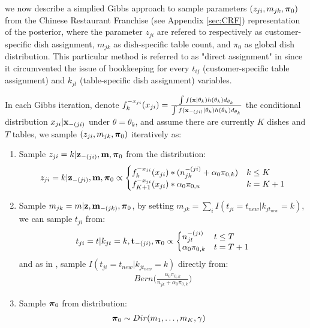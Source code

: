 \documentclass{article} %
\begin{document}
we now describe a simplied Gibbs approach to sample parameters $(z_{ji}, m_{jk}, \boldsymbol{\pi}_0)$ from the Chinese Restaurant Franchise (see Appendix \ref{sec:CRF}) representation of the posterior, where the parameter $z_{ji}$ are refered to respectively as customer-specific dish assignment, $m_{jk}$ as  dish-specific table count, and $\pi_0$ as global dish distribution. This particular method is  referred to as "direct assignment" in \cite{teh_hierarchical_2006} since it circumvented the issue of bookkeeping for every $t_{ij}$ (customer-specific table assignment) and $k_{jt}$ (table-specific dish assignment) variables.

In each Gibbs iteration, denote $f_k^{-x_{ji}}(x_{ji}) =
\frac{\int f({\bf x}|\theta_k) h(\theta_k) d_{\theta_k}}
{\int f({\bf x}_{-(ji)}|\theta_k) h(\theta_k) d_{\theta_k}}$ the conditional distribution $x_{ji} | {\bf x}_{-(ji)}$ under $\theta = \theta_k$, and assume there are currently $K$ dishes and $T$ tables, we sample $(z_{ji}, m_{jk}, \boldsymbol{\pi}_0)$ iteratively as:
\begin{enumerate}
\item Sample $z_{ji} = k | {\bf z}_{-(ji)}, {\bf m}, \boldsymbol{\pi}_0$ from the distribution:
\begin{align*}
z_{ji} = k | \bz_{-(ji)}, \bm, \bpi_0 \propto
\left\{\begin{matrix*}[l]
f_k^{-x_{ji}}(x_{ji}) * (n_{jk}^{-(ji)} + \alpha_0 \pi_{0, k})  & k \leq K
\\
f_{K+1}^{-x_{ji}}(x_{ji}) * \alpha_0 \pi_{0, u}   & k = K+1
\end{matrix*}\right.
\end{align*}
\item Sample $m_{jk} = m | {\bf z}, {\bf m}_{-(jk)}, \boldsymbol{\pi}_0$, by setting $m_{jk} = \sum_{i} I(t_{ji} = t_{new}|k_{jt_{new}} = k)$,
we can sample $t_{ji}$ from:
\begin{align*}
t_{ji} = t | k_{jt} = k, \bt_{-(ji)}, \bpi_0 \propto
\left\{\begin{matrix*}[l]
n_{jt}^{-(ji)}  & t \leq T
\\
\alpha_0 \pi_{0, k}  & t = T+1
\end{matrix*}\right.
\end{align*}
and as in \cite{fox_bayesian_2009}, sample $I(t_{ji} = t_{new}|k_{jt_{new}} = k)$ directly from:
\begin{align*}
Bern \Big(\frac{\alpha_0 \pi_{0, k}}{n_{jk} + \alpha_0 \pi_{0, k}} \Big)
\end{align*}

\item Sample $\boldsymbol{\pi}_0$ from distribution:
\begin{align*}
\boldsymbol{\pi}_0 & \sim Dir(m_1, \dots, m_K, \gamma)
\end{align*}
\end{enumerate}
\end{document}
